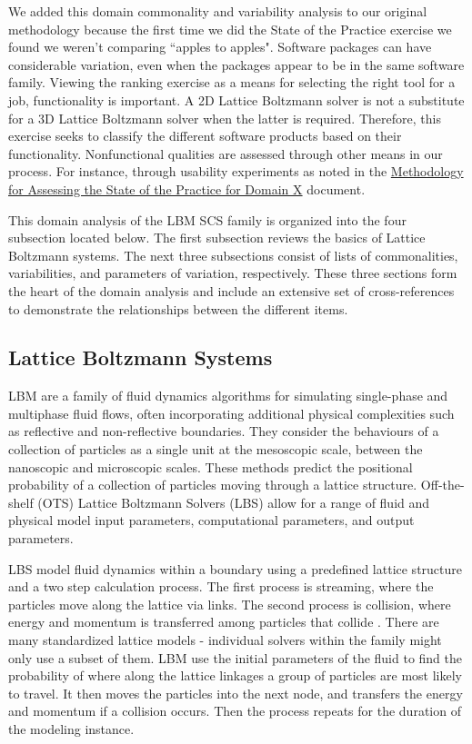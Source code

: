 \documentclass[12pt, notitlepage]{article}
\begin{document}
We added this domain commonality and variability analysis to our original methodology because the first time we did the State of the Practice exercise we found we weren't comparing ``apples to apples". Software packages can have considerable variation, even when the packages appear to be in the same software family. Viewing the ranking exercise as a means for selecting the right tool for a job, functionality is important. A 2D Lattice Boltzmann solver is not a substitute for a 3D Lattice Boltzmann solver when the latter is required. Therefore, this exercise seeks to classify the different software products based on their functionality. Nonfunctional qualities are assessed through other means in our process. For instance, through usability experiments as noted in the \href{https://github.com/smiths/AIMSS/blob/master/StateOfPractice/Methodology/Methodology.pdf}{Methodology for Assessing the State of the Practice for Domain X} document. 

This domain analysis of the LBM SCS family is organized into the four subsection located below. The first subsection reviews the basics of Lattice Boltzmann systems. The next three subsections consist of lists of commonalities, variabilities, and parameters of variation, respectively. These three sections form the heart of the domain analysis and include an extensive set of cross-references to demonstrate the relationships between the different items.

\subsection{Lattice Boltzmann Systems}

LBM are a family of fluid dynamics algorithms for simulating single-phase and multiphase fluid flows, often incorporating additional physical complexities \citep{chen1998lattice} such as reflective and non-reflective boundaries. They consider the behaviours of a collection of particles as a single unit at the mesoscopic scale, between the nanoscopic and microscopic scales. These methods predict the positional probability of a collection of particles moving through a lattice structure. Off-the-shelf (OTS) Lattice Boltzmann Solvers (LBS) allow for a range of fluid and physical model input parameters, computational parameters, and output parameters.

LBS model fluid dynamics within a boundary using a predefined lattice structure and a two step calculation process. The first process is streaming, where the particles move along the lattice via links. The second process is collision, where energy and momentum is transferred among particles that collide \citep{bao2011lattice}.
There are many standardized lattice models - individual solvers within the family might only use a subset of them.
LBM use the initial parameters of the fluid to find the probability of where along the lattice linkages a group of particles are most likely to travel. It then moves the particles into the next node, and transfers the energy and momentum if a collision occurs. Then the process repeats for the duration of the modeling instance.
\end{document}
